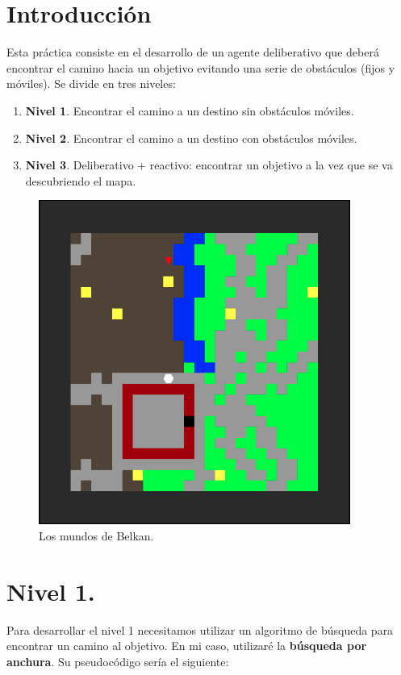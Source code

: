 \documentclass[12pt,spanish]{article}
\begin{document}
\section{Introducción}

Esta práctica consiste en el desarrollo de un agente deliberativo que deberá encontrar el camino hacia un objetivo evitando una serie de obstáculos (fijos y móviles). Se divide en tres niveles:
\begin{enumerate}
  \item \textbf{Nivel 1}. Encontrar el camino a un destino sin obstáculos móviles.
  \item \textbf{Nivel 2}. Encontrar el camino a un destino con obstáculos móviles.
  \item \textbf{Nivel 3}. Deliberativo + reactivo: encontrar un objetivo a la vez que se va descubriendo el mapa.
\end{enumerate}

\begin{figure}[H]
\centering
\includegraphics[scale=0.75]{belkan-1.png}
\caption{Los mundos de Belkan.}
\end{figure}
\section{Nivel 1.}

Para desarrollar el nivel 1 necesitamos utilizar un algoritmo de búsqueda para encontrar un camino al objetivo. En mi caso, utilizaré la \textbf{búsqueda por anchura}. Su pseudocódigo sería el siguiente:
\newpage
\end{document}
